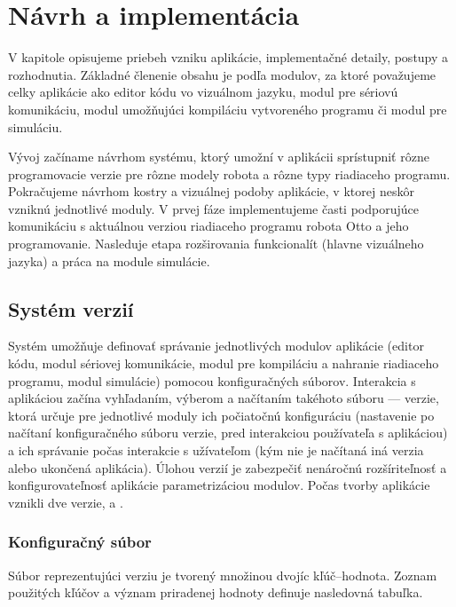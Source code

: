 

\chapter{Návrh a implementácia}
\label{kap:implementacia}

V kapitole opisujeme priebeh vzniku aplikácie, implementačné detaily, postupy a rozhodnutia. Základné členenie obsahu je podľa modulov, za ktoré považujeme celky aplikácie ako editor kódu vo vizuálnom jazyku, modul pre sériovú komunikáciu, modul umožňujúci kompiláciu vytvoreného programu či modul pre simuláciu.

Vývoj začíname návrhom systému, ktorý umožní v aplikácii sprístupniť rôzne programovacie verzie pre rôzne modely robota a rôzne typy riadiaceho programu. Pokračujeme návrhom kostry a vizuálnej podoby aplikácie, v ktorej neskôr vzniknú jednotlivé moduly. V prvej fáze implementujeme časti podporujúce komunikáciu s aktuálnou verziou riadiaceho programu robota Otto a jeho programovanie. Nasleduje etapa rozširovania funkcionalít (hlavne vizuálneho jazyka) a práca na module simulácie.


\section{Systém verzií}
\label{sec:system-verzii}
Systém umožňuje definovať správanie jednotlivých modulov aplikácie (editor kódu, modul sériovej komunikácie, modul pre kompiláciu a nahranie riadiaceho programu, modul simulácie) pomocou konfiguračných súborov. Interakcia s aplikáciou začína vyhľadaním, výberom a načítaním takéhoto súboru --- verzie, ktorá určuje pre jednotlivé moduly ich počiatočnú konfiguráciu (nastavenie po načítaní konfiguračného súboru verzie, pred interakciou používateľa s aplikáciou) a ich správanie počas interakcie s užívateľom (kým nie je načítaná iná verzia alebo ukončená aplikácia). Úlohou verzií je zabezpečiť nenáročnú rozšíriteľnosť a konfigurovateľnosť aplikácie parametrizáciou modulov. Počas tvorby aplikácie vznikli dve verzie,  a .

\subsection{Konfiguračný súbor}
\label{sub:konfig-subor-verzie}
Súbor reprezentujúci verziu je tvorený množinou dvojíc kľúč--hodnota. Zoznam použitých kľúčov a význam priradenej hodnoty definuje nasledovná tabuľka.

